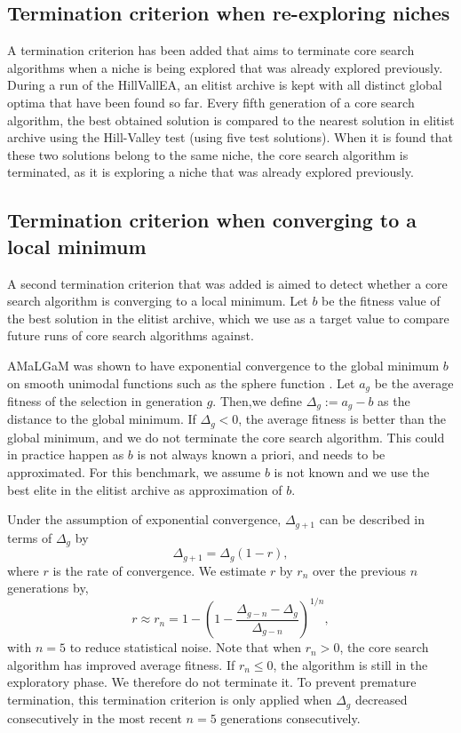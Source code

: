 \documentclass[10pt,a4paper, geometry, fullpage]{article}
\theoremstyle{plain}
\theoremstyle{remark}
\begin{document}
\subsection{Termination criterion when re-exploring niches}
A termination criterion has been added that aims to terminate core search algorithms when a niche is being explored that was already explored previously. During a run of the HillVallEA, an elitist archive is kept with all distinct global optima that have been found so far. Every fifth generation of a core search algorithm, the best obtained solution is compared to the nearest solution in elitist archive using the Hill-Valley test (using five test solutions). When it is found that these two solutions belong to the same niche, the core search algorithm is terminated, as it is exploring a niche that was already explored previously. 

\subsection{Termination criterion when converging to a local minimum}
A second termination criterion that was added is aimed to detect whether a core search algorithm is converging to a local minimum. Let $b$ be the fitness value of the best solution in the elitist archive, which we use as a target value to compare future runs of core search algorithms against. 

AMaLGaM was shown to have exponential convergence to the global minimum $b$ on smooth unimodal functions such as the sphere function \cite{bosman13}. Let $a_{g}$ be the average fitness of the selection in generation $g$. Then,we define $\Delta_g := a_{g} - b$ as the distance to the global minimum. If $\Delta_g < 0$, the average fitness is better than the global minimum, and we do not terminate the core search algorithm. This could in practice happen as $b$ is not always known a priori, and needs to be approximated. For this benchmark, we assume $b$ is not known and we use the best elite in the elitist archive as approximation of $b$. 

Under the assumption of exponential convergence, $\Delta_{g+1}$ can be described in terms of $\Delta_g$ by 
\begin{equation}
\Delta_{g+1} = \Delta_g (1-r),
\end{equation}
where $r$ is the rate of convergence. We estimate $r$ by $r_n$ over the previous $n$ generations by,
\begin{equation}r \approx r_n = 1-\left(1-\frac{\Delta_{g-n} - \Delta_{g}}{\Delta _{g-n}}\right)^{1/n},
\end{equation}
with $n=5$ to reduce statistical noise. Note that when $r_n > 0$, the core search algorithm has improved average fitness. If $r_n \leq 0$, the algorithm is still in the exploratory phase. We therefore do not terminate it. To prevent premature termination, this termination criterion is only applied when $\Delta_g$ decreased consecutively in the most recent $n = 5$ generations consecutively. 
\end{document}
